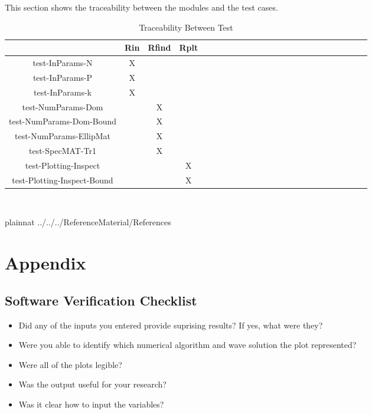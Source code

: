\documentclass[12pt, titlepage]{article}
\begin{document}
This section shows the traceability between the modules and the test cases.

\label{traceability}
\begin{table}[h]
	\centering
	\begin{tabular}{|c|c|c|c|c|c|c|c|c|c|c|c|c|c|c|c|c|c|c|c|c|c|c|c|}
		\hline        
		& Rin& Rfind & Rplt  \\
		\hline
		test-InParams-N     &X & &   \\ \hline
		test-InParams-P    &X& &    \\ \hline
		test-InParams-k    &X & &   \\ \hline 
		test-NumParams-Dom    & &X &     \\ \hline 
		test-NumParams-Dom-Bound    & &X &    \\ \hline 
		test-NumParams-EllipMat    & &X &     \\ \hline 
		test-SpecMAT-Tr1  & &X &    \\ \hline 
		test-Plotting-Inspect & & &X     \\ \hline 
		test-Plotting-Inspect-Bound  & & &X   \\
		\hline
	\end{tabular}\\
	\caption{Traceability Between Test }
	\label{Table:D_1}
\end{table} 

\clearpage
 {plainnat}
 {../../../ReferenceMaterial/References}

\newpage

\section{Appendix} 
\label{app}

\subsection{Software Verification Checklist} 
\label{softwarevercheck}
\begin{itemize}
	\item Did any of the inputs you entered provide suprising results? If yes, 
	what were they?
	\item Were you able to identify which numerical algorithm and wave solution 
	the plot represented? 
	\item Were all of the plots legible? 
	\item Was the output useful for your research? 
	\item Was it clear how to input the variables? 
\end{itemize}  
\end{document}
